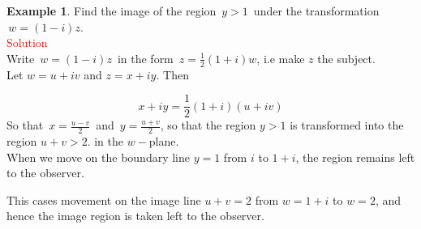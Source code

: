 \documentclass[11pt,a4paper]{article}
\theoremstyle{definition}
\newtheorem{example}[thm]{Example}
\begin{document}
\begin{example}
Find the image of the region $\, y> 1\,$ under the transformation $\,  w = (1 - i)z$.\\

\textcolor{red}{Solution}\\
Write $\, w = (1 - i)z\,$ in the form $\, z = \frac{1}{2}(1 + i)w$, i.e make $z$ the subject.\\

Let $w = u + iv$ and $z = x + iy$. Then 

$$\boxed{x + iy = \frac{1}{2} (1 + i) (u + iv)}$$
So that $\, x = \frac{u - v}{2}\,$ and $\, y = \frac{u + v}{2}$, so that the region $y > 1$ is transformed into the region $u + v>2$. in the $w-$plane.\\
When we move on the boundary line $y = 1$ from $i$ to $1 + i$, the region remains left to the observer.




\begin{figure}[H]
\centering
{}
\end{figure}














This cases movement on the image line $u + v = 2$ from $w = 1 + i$ to $w = 2$, and hence the image region is taken left to the observer.



\begin{figure}[H]
\centering
{}
\end{figure}
\end{example}
\end{document}
